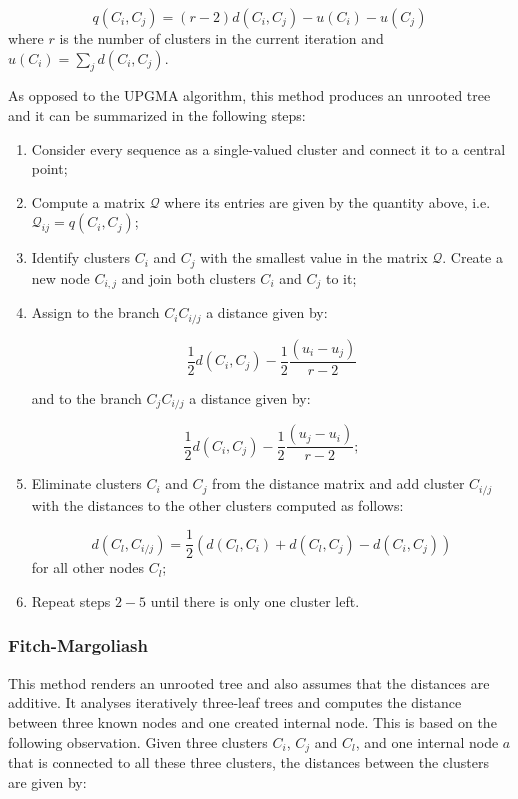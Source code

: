 $$q(C_i,C_j) = (r-2) d(C_i, C_j) - u(C_i) - u(C_j)$$
where $r$ is the number of clusters in the current iteration and $u(C_i) = \sum_j d(C_i, C_j)$. 

As opposed to the UPGMA algorithm, this method produces an unrooted tree and it can be summarized in the following steps:

\begin{enumerate}
    \item Consider every sequence as a single-valued cluster and connect it to a central point;
    \item Compute a matrix $\mathcal{Q}$ where its entries are given by the quantity above, i.e. $\mathcal{Q}_{ij} = q(C_i,C_j)$;
    \item Identify clusters $C_i$ and $C_j$ with the smallest value in the matrix $\mathcal{Q}$. Create a new node $C_{i,j}$ and join both clusters $C_i$ and $C_j$ to it;
    \item Assign to the branch $C_i C_{i/j}$ a distance given by:
    
    $$\frac{1}{2}d(C_i, C_j) - \frac{1}{2}\frac{(u_i - u_j)}{r-2}$$
    
    and to the branch $C_j C_{i/j}$ a distance given by:
    
    $$\frac{1}{2}d(C_i, C_j) - \frac{1}{2}\frac{(u_j - u_i)}{r-2};$$
    
    \item Eliminate clusters $C_i$ and $C_j$ from the distance matrix and add cluster $C_{i/j}$ with the distances to the other clusters computed as follows:
    
    $$d(C_l, C_{i/j}) = \frac{1}{2}(d(C_l, C_i) + d(C_l, C_j) - d(C_i, C_j))$$
    for all other nodes $C_l$;
    
    \item Repeat steps $2-5$ until there is only one cluster left.
\end{enumerate}


\subsubsection{Fitch-Margoliash}

This method renders an unrooted tree and also assumes that the distances are additive. It analyses iteratively three-leaf trees and computes the distance between three known nodes and one created internal node. This is based on the following observation. Given three clusters $C_i$, $C_j$ and $C_l$, and one internal node $a$ that is connected to all these three clusters, the distances between the clusters are given by:

